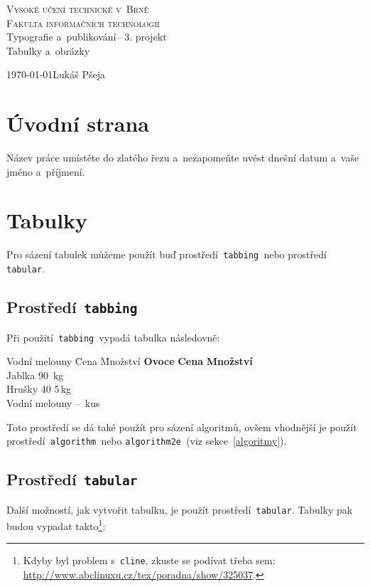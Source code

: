 \documentclass[a4paper, 11pt]{article}
\begin{document}
\begin{titlepage}
    \begin{center}
        \textsc{\Huge Vysoké učení technické v~Brně}\\
        \medskip
        \textsc{\huge Fakulta informačních technologií}\\
        \bigskip
        {\LARGE Typografie a~publikování\,--\,3. projekt}\\
        \medskip
        {\Huge Tabulky a~obrázky}
    \end{center}
    {\Large \today \hfill Lukáš Pšeja}\\\null
\end{titlepage}

\section{Úvodní strana}
    Název práce umístěte do zlatého řezu a~nezapomeňte uvést dnešní datum a~vaše jméno a~příjmení.

\section{Tabulky}
    Pro sázení tabulek můžeme použít buď prostředí\texttt{ tabbing }nebo prostředí\texttt{ tabular}.

    \subsection{Prostředí\texttt{ tabbing}}
        Při použití\texttt{ tabbing }vypadá tabulka následovně:
        \begin{tabbing}
            Vodní melouny \quad \= Cena \quad \= Množství \kill
            \textbf{Ovoce} \> \textbf{Cena} \> \textbf{Množství} \\
            Jablka 90 \,kg \\
            Hrušky 40 5\,kg \\
            Vodní melouny -- \,kus \\
        \end{tabbing}
        Toto prostředí se dá také použít pro sázení algoritmů, ovšem vhodnější je použít prostředí\texttt{ algorithm }nebo \texttt{algorithm2e }(viz sekce~\ref{algoritmy}).

    \subsection{Prostředí\texttt{ tabular}}
        Další možností, jak vytvořit tabulku, je použít prostředí\texttt{ tabular}. Tabulky pak budou vypadat takto\footnote{Kdyby byl problem s\texttt{ cline}, zkuste se podívat třeba sem: \href{http://www.abclinuxu.cz/tex/poradna/show/325037}{http://www.abclinuxu.cz/tex/poradna/show/325037}.}:
        \bigskip
\end{document}

